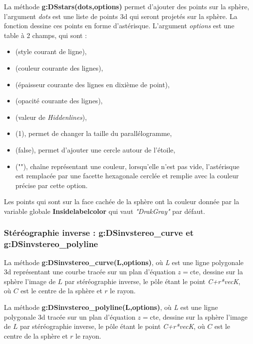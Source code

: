 La méthode \textbf{g:DSstars(dots,options)} permet d'ajouter des points sur la sphère, l'argument \emph{dots} est une liste de points 3d qui seront projetés sur la sphère. La fonction dessine ces points en forme d'astérisque. L'argument \emph{options} est une table à 2 champs, qui sont :
   \begin{itemize}
        \item {} (style courant de ligne), 
        \item {} (couleur courante des lignes),
        \item {} (épaisseur courante des lignes en dixième de point),
        \item {} (opacité courante des lignes),
        \item {} (valeur de \emph{Hiddenlines}),
        \item {} (1), permet de changer la taille du parallélogramme,
        \item {} (false), permet d'ajouter une cercle autour de l'étoile,
        \item {} (""), chaîne représentant une couleur, lorsqu'elle n'est pas vide, l'astérisque est remplacée par une facette hexagonale cerclée et remplie avec la couleur précise par cette option.
    \end{itemize}   
Les points qui sont sur la face cachée de la sphère ont la couleur donnée par la variable globale \textbf{Insidelabelcolor} qui vaut \emph{"DrakGray"} par défaut.

\subsubsection{Stéréographie inverse : g:DSinvstereo\_curve et g:DSinvstereo\_polyline}

La méthode \textbf{g:DSinvstereo\_curve(L,options)}, où \emph{L} est une ligne polygonale 3d représentant une courbe tracée sur un plan d'équation $z =$cte, dessine sur la sphère l'image de $L$ par stéréographie inverse, le pôle étant le point \emph{C+r*vecK}, où $C$ est le centre de la sphère et $r$ le rayon.

La méthode \textbf{g:DSinvstereo\_polyline(L,options)}, où \emph{L} est une ligne polygonale 3d tracée sur un plan d'équation $z =$cte, dessine sur la sphère l'image de $L$ par stéréographie inverse, le pôle étant le point \emph{C+r*vecK}, où $C$ est le centre de la sphère et $r$ le rayon.

